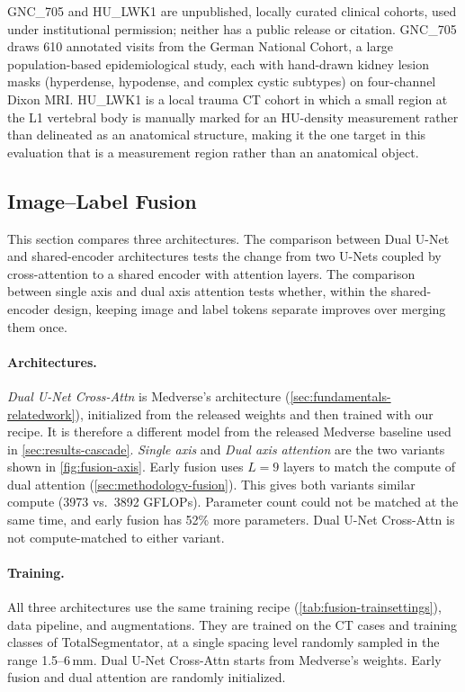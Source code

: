 \documentclass[hidelinks, a4paper, 12pt, ngerman, english]{article}  %
\begin{document}
\begin{table}[t]
  \raggedright\footnotesize
  GNC\_705 and HU\_LWK1 are unpublished, locally curated clinical cohorts, used
  under institutional permission; neither has a public release or citation.
  GNC\_705 draws 610 annotated visits from the German National Cohort, a
  large population-based epidemiological study, each with hand-drawn kidney
  lesion masks (hyperdense, hypodense, and complex cystic subtypes) on
  four-channel Dixon MRI. HU\_LWK1 is a local trauma CT cohort in which a
  small region at the L1 vertebral body is manually marked for an HU-density
  measurement rather than delineated as an anatomical structure, making it
  the one target in this evaluation that is a measurement region rather than
  an anatomical object.
\end{table}
\subsection{Image--Label Fusion}\label{sec:results-fusion}

This section compares three architectures. The comparison between Dual U-Net
 and shared-encoder architectures tests the change from two U-Nets coupled by
cross-attention to a shared encoder with attention layers. The comparison
between single axis and dual axis attention tests whether, within the
shared-encoder design, keeping image and label tokens separate improves over
merging them once.

\paragraph{Architectures.}
\emph{Dual U-Net Cross-Attn} is Medverse's architecture
(\autoref{sec:fundamentals-relatedwork}), initialized from the released weights
and then trained with our recipe. It is therefore a different model from the
released Medverse baseline used in \autoref{sec:results-cascade}.
\emph{Single axis} and \emph{Dual axis attention} are the two variants shown in
\autoref{fig:fusion-axis}. Early fusion uses $L{=}9$ layers to match the compute of dual attention (\autoref{sec:methodology-fusion}).
This gives both variants similar compute (3973 vs.\ 3892 GFLOPs). Parameter
count could not be matched at the same time, and early fusion has 52\% more
parameters. Dual U-Net Cross-Attn is not compute-matched to either variant.

\paragraph{Training.}
All three architectures use the same training recipe
(\autoref{tab:fusion-trainsettings}), data pipeline, and augmentations. They
are trained on the CT cases and training classes of TotalSegmentator, at a single spacing level randomly sampled in the range 1.5--6\,mm. 
Dual U-Net
Cross-Attn starts from Medverse's weights. Early fusion and dual attention
are randomly initialized.
\end{document}
